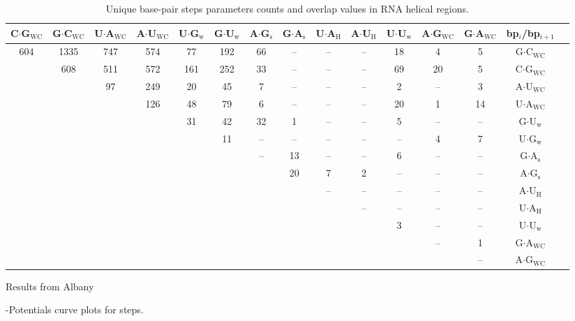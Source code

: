 \begin{sidewaystable}[htbp]
\begin{center}
\begin{tabular}{|c|c|c|c|c|c|c|c|c|c|c|c|c|c|c|}
\hline
C$\cdot$G$_{\text{WC}}$ & G$\cdot$C$_{\text{WC}}$ & U$\cdot$A$_{\text{WC}}$ &
A$\cdot$U$_{\text{WC}}$ & U$\cdot$G$_{\text{w}}$ &
G$\cdot$U$_{\text{w}}$ & A$\cdot$G$_{\text{s}}$ &
G$\cdot$A$_{\text{s}}$ & U$\cdot$A$_{\text{H}}$ &
A$\cdot$U$_{\text{H}}$ & U$\cdot$U$_{\text{w}}$ &
A$\cdot$G$_{\text{WC}}$ & G$\cdot$A$_{\text{WC}}$ & bp$_{i}$/bp$_{i+1}$\\ 
\hline  
604 & 1335 & 747 & 574 & 77 & 192 & 66 & -- & -- & -- & 18 & 4 & 5 & G$\cdot$C$_{\text{WC}}$\\
 & 608 & 511 & 572 & 161 & 252 & 33 & -- & -- & -- & 69 & 20 & 5 & C$\cdot$G$_{\text{WC}}$\\
 &  & 97 & 249 & 20 & 45 & 7 & -- & -- & -- & 2 & -- & 3 & A$\cdot$U$_{\text{WC}}$\\
 &  &  & 126 & 48 & 79 & 6 & -- & -- & -- & 20 & 1 & 14 & U$\cdot$A$_{\text{WC}}$\\
 &  &  &  & 31 & 42 & 32 & 1 & -- & -- & 5 & -- & -- & G$\cdot$U$_{\text{w}}$\\
 &  &  &  &  & 11 & -- & -- & -- & -- & -- & 4 & 7 & U$\cdot$G$_{\text{w}}$\\
 &  &  &  &  &  & -- & 13 & -- & -- & 6 & -- & -- & G$\cdot$A$_{\text{s}}$\\ 
 &  &  &  &  &  &  & 20 & 7 & 2 & -- & -- & -- & A$\cdot$G$_{\text{s}}$\\
 &  &  &  &  &  &  &  & -- & -- & -- & -- & -- & A$\cdot$U$_{\text{H}}$\\
 &  &  &  &  &  &  &  &  & -- & -- & -- & -- & U$\cdot$A$_{\text{H}}$\\
 &  &  &  &  &  &  &  &  &  & 3 & -- & -- & U$\cdot$U$_{\text{w}}$\\
 &  &  &  &  &  &  &  &  &  &  & -- & 1 & G$\cdot$A$_{\text{WC}}$\\
 &  &  &  &  &  &  &  &  &  &  &  & -- & A$\cdot$G$_{\text{WC}}$\\
\hline
\end{tabular}
\caption{Unique base-pair steps parameters counts and overlap values
  in RNA helical regions.}
\label{tab:91steps}
\end{center}
\end{sidewaystable}



Results from Albany

-Potentials curve plots for steps.




